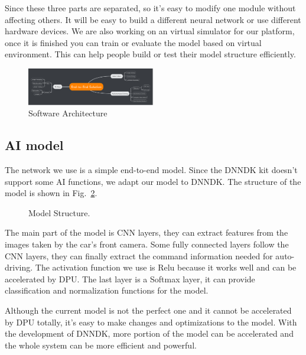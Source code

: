\documentclass[conference]{IEEEtran}
\begin{document}
Since these three parts are separated, so it's easy to modify one module without affecting others. It will be easy to build a different neural network or use different hardware devices. We are also working on an virtual simulator for our platform, once it is finished you can train or evaluate the model based on virtual environment. This can help people build or test their model structure efficiently.
\begin{figure}[htbp]
\centerline{\includegraphics[width=0.5\textwidth]{software-architecture.jpg}}
\caption{Software Architecture}
\label{sa}
\end{figure}

\subsection{AI model}

The network we use is a simple end-to-end model. Since the DNNDK kit doesn't support some AI functions, we adapt our model to DNNDK. The structure of the model is shown in Fig.~\ref{ms}.

\begin{figure}[htbp]
\caption{Model Structure.}
\label{ms}
\end{figure}

The main part of the model is CNN layers, they can extract features from the images taken by the car's front camera. Some fully connected layers follow the CNN layers, they can finally extract the command information needed for auto-driving. The activation function we use is Relu because it works well and can be accelerated by DPU. The last layer is a Softmax layer, it can provide classification and normalization functions for the model.  

Although the current model is not the perfect one and it cannot be accelerated by DPU totally, it's easy to make changes and optimizations to the model. With the development of DNNDK, more portion of the model can be accelerated and the whole system can be more efficient and powerful.
\end{document}
